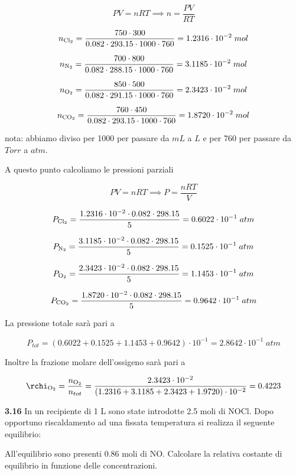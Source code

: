 $$PV=nRT \implies n=\frac{PV}{RT}$$

$$n_{\rm Cl_2}=\frac{750 \cdot 300}{0.082 \cdot 293.15 \cdot 1000 \cdot 760}=1.2316 \cdot 10^{-2}\;mol$$

$$n_{\rm N_2}=\frac{700 \cdot 800}{0.082 \cdot 288.15 \cdot 1000 \cdot 760}=3.1185 \cdot 10^{-2}\;mol$$

$$n_{\rm O_2}=\frac{850 \cdot 500}{0.082 \cdot 291.15 \cdot 1000 \cdot 760}=2.3423 \cdot 10^{-2}\;mol$$

$$n_{\rm CO_2}=\frac{760 \cdot 450}{0.082 \cdot 293.15 \cdot 1000 \cdot 760}=1.8720 \cdot 10^{-2}\;mol$$

nota: abbiamo diviso per 1000 per passare da $mL$ a $L$ e per 760 per passare da $Torr$ a $atm$.

A questo punto calcoliamo le pressioni parziali

$$PV=nRT \implies P=\frac{nRT}{V}$$

$$P_{\rm Cl_2}=\frac{1.2316 \cdot 10^{-2} \cdot 0.082 \cdot 298.15}{5}=0.6022 \cdot 10^{-1}\;atm$$

$$P_{\rm N_2}=\frac{3.1185 \cdot 10^{-2} \cdot 0.082 \cdot 298.15}{5}=0.1525 \cdot 10^{-1}\;atm$$

$$P_{\rm O_2}=\frac{2.3423 \cdot 10^{-2} \cdot 0.082 \cdot 298.15}{5}=1.1453 \cdot 10^{-1}\;atm$$

$$P_{\rm CO_2}=\frac{1.8720 \cdot 10^{-2} \cdot 0.082 \cdot 298.15}{5}=0.9642 \cdot 10^{-1}\;atm$$

La pressione totale sarà pari a

$$P_{tot}=(0.6022 + 0.1525 + 1.1453 + 0.9642) \cdot 10^{-1}=2.8642 \cdot 10^{-1}\;atm$$

Inoltre la frazione molare dell'ossigeno sarà pari a

$$\rchi_{\rm O_2}=\frac{n_{\rm O_2}}{n_{tot}}=\frac{2.3423 \cdot 10^{-2}}{(1.2316 + 3.1185 + 2.3423 + 1.9720) \cdot 10^{-2}}=0.4223$$

\vspace{0.2cm}\textbf{3.16} In un recipiente di 1 L sono state introdotte 2.5 moli di NOCl. Dopo opportuno riscaldamento ad una fissata temperatura si realizza il seguente equilibrio:

\begin{center}
\end{center}

All'equilibrio sono presenti 0.86 moli di NO. Calcolare la relativa costante di equilibrio in funzione delle concentrazioni.


